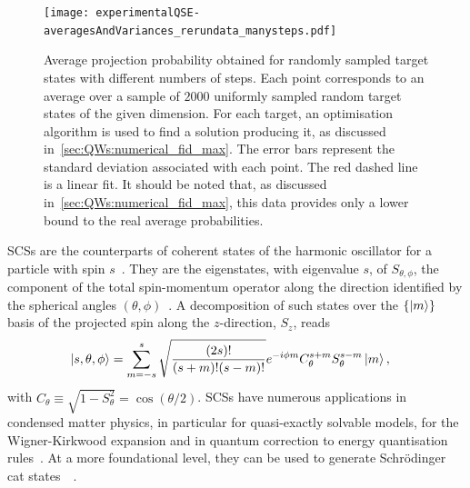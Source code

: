 \begin{figure}[tb]
    \centering
    \texttt{[image: experimentalQSE-averagesAndVariances\_rerundata\_manysteps.pdf]}
    \caption{
    	Average projection probability obtained for randomly sampled target states with different numbers of steps. Each point corresponds to an average over a sample of $2000$ uniformly sampled random target states of the given dimension. For each target, an optimisation algorithm is used to find a solution producing it, as discussed in~\cref{sec:QWs:numerical_fid_max}. The error bars represent the standard deviation associated with each point. The red dashed line is a linear fit. It should be noted that, as discussed in~\cref{sec:QWs:numerical_fid_max}, this data provides only a lower bound to the real average probabilities.%
    }
    \label{fig:expQWs:avgProbabilitiesVsStepNumber}
\end{figure}


\acfp{SCS} are the counterparts of coherent states of the harmonic oscillator for a particle with spin $s$~\cite{radcliffe1971some,arecchi1972atomic,agarwal1997atomic,markham2003classicality,chryssomalakos2018geometry}. They are the eigenstates, with eigenvalue $s$, of $S_{\theta,\phi}$, the component of the total spin-momentum operator along the direction identified by the spherical angles $(\theta, \phi)$~\cite{arecchi1972atomic,agarwal1997atomic,ulyanov1999spin,lee2015visualizing}.
A decomposition of such states over the $\{\ket{m}\}$ basis of the projected spin along the $z$-direction, $S_z$, reads
\begin{equation}
\begin{aligned}
	\ket{s,\theta,\phi} &=
		\sum_{m=-s}^{s}
		\sqrt{\frac{(2s)!}{(s+m)!(s-m)!}} e^{-i\phi m} C_\theta^{s+m} S_\theta^{s-m}\ket{m},
\end{aligned}
\label{spin_coherent1}
\end{equation}
with $C_\theta\equiv\sqrt{1-S^2_\theta}=\cos(\theta/2)$. \acp{SCS} have numerous applications in condensed matter physics, in particular for quasi-exactly solvable models, for the Wigner-Kirkwood expansion and in quantum correction to energy quantisation rules~\cite{ulyanov1999spin}. At a more foundational level, they can be used to generate Schrödinger cat states~~\cite{agarwal1997atomic}. 

